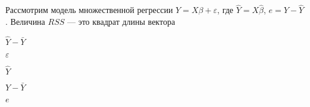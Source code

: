 
\begin{question}
Рассмотрим модель множественной регрессии \(Y=X\beta+\varepsilon\), где
\(\hat Y = X\hat\beta\), \(e=Y-\hat Y\). Величина \(RSS\) --- это
квадрат длины вектора
\begin{answerlist}
  \item \(\hat Y - \bar Y\)
  \item \(\varepsilon\)
  \item \(\hat Y\)
  \item \(Y-\bar Y\)
  \item \(e\)
\end{answerlist}
\end{question}


